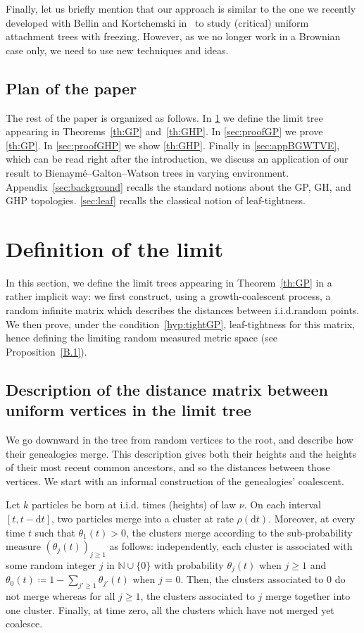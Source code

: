 \documentclass[AHL,Unicode,published]{cedram}
\newcommand{\rmd}{\mathrm{d}}
\newcommand{\N}{\mathbb{N}}
\newcommand{\1}{\mathbbm{1}}
\begin{document}
Finally, let us briefly mention that our approach is similar to the one we recently developed with Bellin and Kortchemski in~\cite{BBKK23+,BBKKbis23+} to study (critical) uniform attachment trees with freezing. However, as we no longer work in a Brownian case only, we need to use new techniques and ideas.

\subsection*{Plan of the paper}
The rest of the paper is organized as follows. In \cref{sec:deflimit} we define the limit tree appearing in Theorems~\ref{th:GP} and~\ref{th:GHP}. In \cref{sec:proofGP} we prove \cref{th:GP}. In \cref{sec:proofGHP} we show \cref{th:GHP}. Finally in \cref{sec:appBGWTVE}, which can be read right after the introduction, we discuss an application of our result to Bienaymé--Galton--Watson trees in varying environment. Appendix~\ref{sec:background} recalls the standard notions about the GP, GH, and GHP topologies. \cref{sec:leaf} recalls the classical notion of leaf-tightness.

\section{Definition of the limit} \label{sec:deflimit}
In this section, we define the limit trees appearing in Theorem~\ref{th:GP} in a rather implicit way: we first construct, using a growth-coalescent process, a random infinite matrix which describes the distances between i.i.d.\@ random points. We then prove, under the condition~\ref{hyp:tightGP}, leaf-tightness for this matrix, hence defining the limiting random measured metric space (see Proposition~\ref{B.1}).

\subsection{Description of the distance matrix between uniform vertices in the limit tree}\label{sec: coalescent continu}
We go downward in the tree from random vertices to the root, and describe how their genealogies merge. This description gives both their heights and the heights of their most recent common ancestors, and so the distances between those vertices. We start with an informal construction of the genealogies' coalescent.

Let $k$ particles be born at i.i.d. times (heights) of law $\nu$. On each interval $[t,t-\rmd t]$, two particles merge into a cluster at rate $\rho(\rmd t)$. Moreover, at every time $t$ such that $\theta_1(t)>0$, the clusters merge according to the sub-probability measure $(\theta_j(t))_{j \ge 1}$ as follows: independently, each cluster is associated with some random integer $j$ in $\N \cup \{0\}$ with probability $\theta_j(t)$ when $j\ge 1$ and $\theta_0(t)\coloneqq1-\sum_{j'\ge 1} \theta_{j'}(t)$ when $j=0$. Then, the clusters associated to $0$ do not merge whereas for all $j \ge 1$, the clusters associated to $j$ merge together into one cluster. Finally, at time zero, all the clusters which have not merged yet coalesce.
\end{document}
